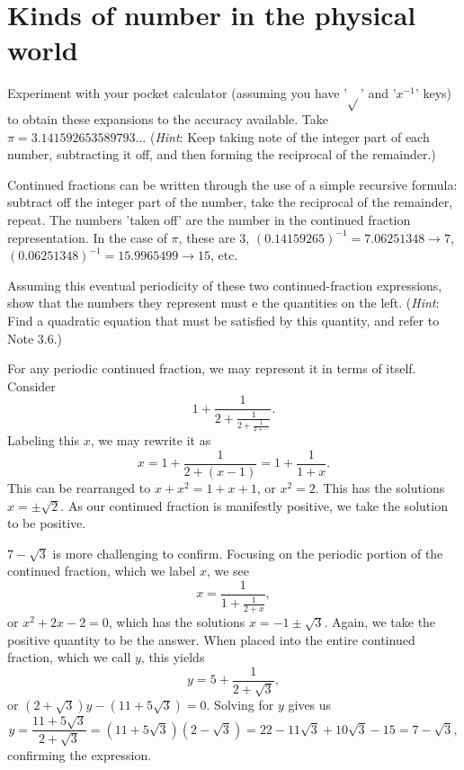 \documentclass[../the-road-to-reality.tex]{subfiles}
\begin{document}
\section{Kinds of number in the physical world}

\begin{questions}
	
\question Experiment with your pocket calculator (assuming you have '$\sqrt{}$' and '$ x^{-1} $' keys) to obtain these expansions to the accuracy available. Take $\pi = 3.141592653589793 \dots$ (\textit{Hint}: Keep taking note of the integer part of each number, subtracting it off, and then forming the reciprocal of the remainder.)

\begin{solution}
	Continued fractions can be written through the use of a simple recursive formula: subtract off the integer part of the number, take the reciprocal of the remainder, repeat. The numbers 'taken off' are the number in the continued fraction representation. In the case of $\pi$, these are $3$, $(0.14159265)^{-1} = 7.06251348 \to 7$, $(0.06251348)^{-1} = 15.9965499 \to 15$, etc.
\end{solution}

\question Assuming this eventual periodicity of these two continued-fraction expressions, show that the numbers they represent must e the quantities on the left. (\textit{Hint}: Find a quadratic equation that must be satisfied by this quantity, and refer to Note 3.6.)

\begin{solution}
	For any periodic continued fraction, we may represent it in terms of itself. Consider $$1 + \frac{1}{2 + \frac{1}{2 + \frac{1}{2 + \cdots}}}.$$Labeling this $x$, we may rewrite it as $$x = 1 + \frac{1}{2 + (x - 1)} = 1 + \frac{1}{1 + x}.$$This can be rearranged to $x + x^2 = 1 + x + 1$, or $x^2 = 2$. This has the solutions $x = \pm\sqrt{2}$. As our continued fraction is manifestly positive, we take the solution to be positive.

	$7 - \sqrt{3}$ is more challenging to confirm. Focusing on the periodic portion of the continued fraction, which we label $x$, we see $$x = \frac{1}{1 + \frac{1}{2 + x}},$$or $x^2 + 2x - 2 = 0$, which has the solutions $x = -1 \pm \sqrt{3}$. Again, we take the positive quantity to be the answer. When placed into the entire continued fraction, which we call $y$, this yields $$y = 5 + \frac{1}{2 + \sqrt{3}},$$or $(2 + \sqrt{3})y - (11 + 5\sqrt{3}) = 0$. Solving for $y$ gives us $$y = \frac{11+5\sqrt{3}}{2 + \sqrt{3}} = (11 + 5\sqrt{3})(2 - \sqrt{3}) = 22 - 11\sqrt{3} + 10\sqrt{3} - 15 = 7 - \sqrt{3},$$ confirming the expression.
\end{solution}


\end{questions}
\end{document}
